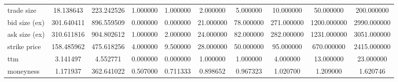 \begin{table}[!h]
\begin{tabular}{@{}lSSSSSSSSS@{}}
        trade size           & 18.138643                        & 223.242526  & 1.000000 & 1.000000 & 2.000000  & 5.000000  & 10.000000  & 50.000000   & 200.000000  \\
        bid size (ex)        & 301.640411                       & 896.559509  & 0.000000 & 0.000000 & 21.000000 & 78.000000 & 271.000000 & 1200.000000 & 2990.000000 \\
        ask size (ex)        & 310.611816                       & 904.802612  & 1.000000 & 2.000000 & 24.000000 & 82.000000 & 282.000000 & 1231.000000 & 3051.000000 \\
        strike price         & 158.485962                       & 475.618256  & 4.000000 & 9.500000 & 28.000000 & 50.000000 & 95.000000  & 670.000000  & 2415.000000 \\
        ttm                  & 3.141497                         & 4.552771    & 0.000000 & 0.000000 & 1.000000  & 1.000000  & 4.000000   & 13.000000   & 23.000000   \\
        moneyness            & 1.171937                         & 362.641022  & 0.507000 & 0.711333 & 0.898652  & 0.967323  & 1.020700   & 1.209000    & 1.620746    \\
        \bottomrule
    \end{tabular}
\end{table}

